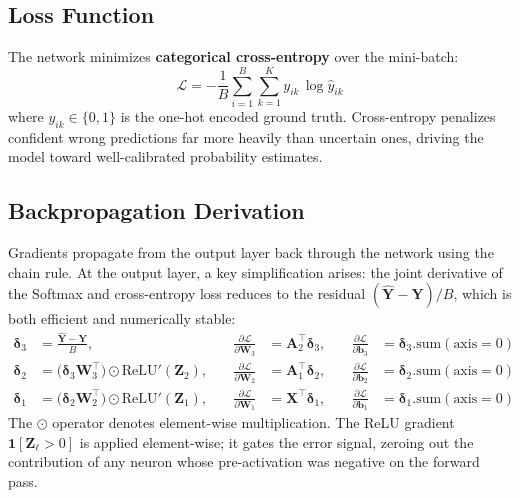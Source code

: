 \documentclass[12pt]{article}
\begin{document}
\subsection{Loss Function}

The network minimizes \textbf{categorical cross-entropy} over the mini-batch:
\[
  \mathcal{L}
  = -\frac{1}{B} \sum_{i=1}^{B} \sum_{k=1}^{K} y_{ik}\,\log\hat{y}_{ik}
\]
where $y_{ik} \in \{0,1\}$ is the one-hot encoded ground truth. Cross-entropy penalizes
confident wrong predictions far more heavily than uncertain ones, driving the model toward
well-calibrated probability estimates.

\subsection{Backpropagation Derivation}

Gradients propagate from the output layer back through the network using the chain rule.
At the output layer, a key simplification arises: the joint derivative of the Softmax
and cross-entropy loss reduces to the residual $(\hat{\mathbf{Y}} - \mathbf{Y})/B$,
which is both efficient and numerically stable:
\begin{align*}
  \boldsymbol{\delta}_3 &= \frac{\hat{\mathbf{Y}} - \mathbf{Y}}{B},
  &\quad \frac{\partial \mathcal{L}}{\partial \mathbf{W}_3}
    &= \mathbf{A}_2^\top \boldsymbol{\delta}_3,
  &\quad \frac{\partial \mathcal{L}}{\partial \mathbf{b}_3}
    &= \boldsymbol{\delta}_3.\text{sum}(\text{axis}=0) \\
  \boldsymbol{\delta}_2 &=
    \bigl(\boldsymbol{\delta}_3 \mathbf{W}_3^\top\bigr)
    \odot \text{ReLU}'(\mathbf{Z}_2),
  &\quad \frac{\partial \mathcal{L}}{\partial \mathbf{W}_2}
    &= \mathbf{A}_1^\top \boldsymbol{\delta}_2,
  &\quad \frac{\partial \mathcal{L}}{\partial \mathbf{b}_2}
    &= \boldsymbol{\delta}_2.\text{sum}(\text{axis}=0) \\
  \boldsymbol{\delta}_1 &=
    \bigl(\boldsymbol{\delta}_2 \mathbf{W}_2^\top\bigr)
    \odot \text{ReLU}'(\mathbf{Z}_1),
  &\quad \frac{\partial \mathcal{L}}{\partial \mathbf{W}_1}
    &= \mathbf{X}^\top \boldsymbol{\delta}_1,
  &\quad \frac{\partial \mathcal{L}}{\partial \mathbf{b}_1}
    &= \boldsymbol{\delta}_1.\text{sum}(\text{axis}=0)
\end{align*}
The $\odot$ operator denotes element-wise multiplication. The ReLU gradient
$\mathbf{1}[\mathbf{Z}_\ell > 0]$ is applied element-wise; it gates the error signal,
zeroing out the contribution of any neuron whose pre-activation was negative on the
forward pass.
\end{document}
